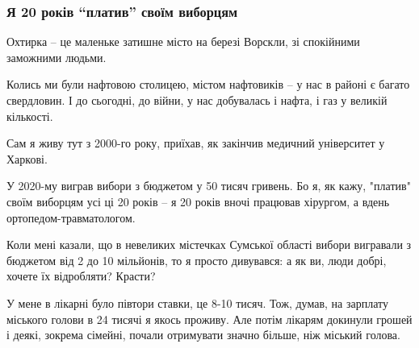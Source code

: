  
 
 
 
 

\subsubsection{Я 20 років \enquote{платив} своїм виборцям}
\label{sec:30_03_2022.stz.news.ua.pravda.2.ohtyrka.2.platyv_vyborci}

Охтирка – це маленьке затишне місто на березі Ворскли, зі спокійними заможними
людьми. 

Колись ми були нафтовою столицею, містом нафтовиків – у нас в районі є багато
свердловин. І до сьогодні, до війни, у нас добувалась і нафта, і газ у великій
кількості. 

Сам я живу тут з 2000-го року, приїхав, як закінчив медичний університет у
Харкові. 

У 2020-му виграв вибори з бюджетом у 50 тисяч гривень. Бо я, як кажу, "платив"
своїм виборцям усі ці 20 років – я 20 років вночі працював хірургом, а вдень
ортопедом-травматологом.


Коли мені казали, що в невеликих містечках Сумської області вибори вигравали з
бюджетом від 2 до 10 мільйонів, то я просто дивувався: а як ви, люди добрі,
хочете їх відробляти? Красти?

У мене в лікарні було півтори ставки, це 8-10 тисяч. Тож, думав, на зарплату
міського голови в 24 тисячі я якось проживу. Але потім лікарям докинули грошей
і деякі, зокрема сімейні, почали отримувати значно більше, ніж міський голова.
